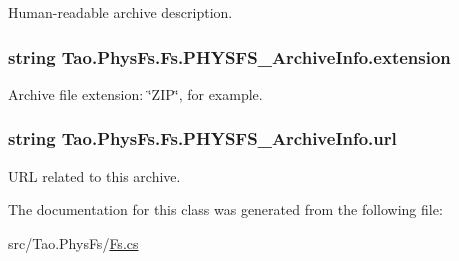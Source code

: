 Human-\/readable archive description. 

\hypertarget{class_tao_1_1_phys_fs_1_1_fs_1_1_p_h_y_s_f_s___archive_info_a801e286a7debe951b5f08f06bb9210f6}{
\subsubsection[{extension}]{\setlength{\rightskip}{0pt plus 5cm}string {\bf Tao.PhysFs.Fs.PHYSFS\_\-ArchiveInfo.extension}}}
\label{class_tao_1_1_phys_fs_1_1_fs_1_1_p_h_y_s_f_s___archive_info_a801e286a7debe951b5f08f06bb9210f6}


Archive file extension: \char`\"{}ZIP\char`\"{}, for example. 

\hypertarget{class_tao_1_1_phys_fs_1_1_fs_1_1_p_h_y_s_f_s___archive_info_a48d8670b8cee012fe535b64f6234a068}{
\subsubsection[{url}]{\setlength{\rightskip}{0pt plus 5cm}string {\bf Tao.PhysFs.Fs.PHYSFS\_\-ArchiveInfo.url}}}
\label{class_tao_1_1_phys_fs_1_1_fs_1_1_p_h_y_s_f_s___archive_info_a48d8670b8cee012fe535b64f6234a068}


URL related to this archive. 



The documentation for this class was generated from the following file:\begin{DoxyCompactItemize}
\item 
src/Tao.PhysFs/\hyperlink{_fs_8cs}{Fs.cs}\end{DoxyCompactItemize}

